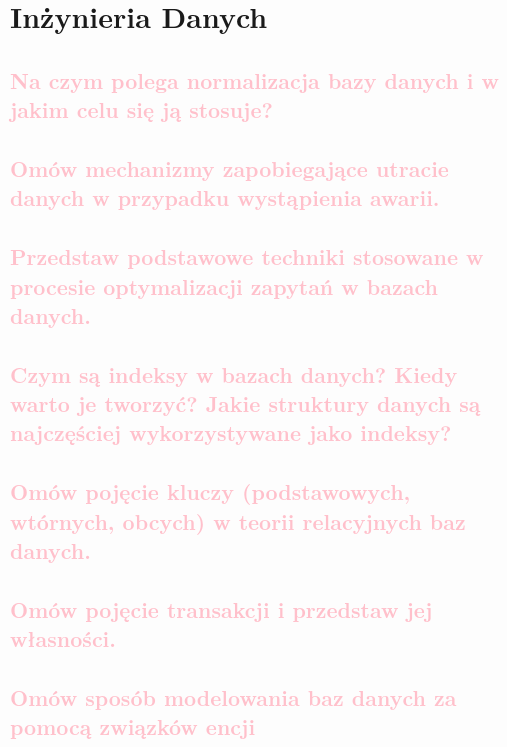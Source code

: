 \chapter{Inżynieria Danych}

\section{\textcolor{pink}{Na czym polega normalizacja bazy danych i w jakim celu się ją stosuje?}}

\section{\textcolor{pink}{Omów mechanizmy zapobiegające utracie danych w przypadku wystąpienia awarii.}}

\section{\textcolor{pink}{Przedstaw podstawowe techniki stosowane w procesie optymalizacji zapytań w bazach danych.}}

\section{\textcolor{pink}{Czym są indeksy w bazach danych? Kiedy warto je tworzyć? Jakie struktury danych są najczęściej wykorzystywane jako indeksy?}}

\section{\textcolor{pink}{Omów pojęcie kluczy (podstawowych, wtórnych, obcych) w teorii relacyjnych baz danych.}}

\section{\textcolor{pink}{Omów pojęcie transakcji i przedstaw jej własności.}}

\section{\textcolor{pink}{Omów sposób modelowania baz danych za pomocą związków encji}}